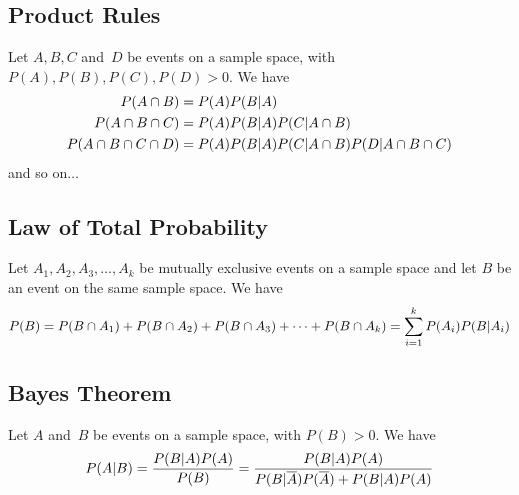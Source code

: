 \subsection*{Product Rules}
\begin{theorem}
Let $A, B, C$ and~$D$ be events on a sample space, with $P(A), P(B), P(C), P(D) > 0$. We have
\begin{align*}
    P(A \cap B) &= P(A)P(B \vert A) \\
    P(A \cap B \cap C) &= P(A)P(B \vert A)P(C \vert A \cap B) \\
    P(A \cap B \cap C \cap D) &=
    P(A)P(B \vert A)P(C \vert A \cap B)P(D \vert A \cap B \cap C) \\
\end{align*}
and so on$\ldots$
\end{theorem}
\subsection*{Law of Total Probability}
\begin{theorem}
Let $A_1, A_2, A_3,\ldots,A_k$ be mutually exclusive events on a sample space and let $B$ be an event on the same sample space. We have
\[
    P(B) = P(B \cap A_1) + P(B \cap A_2) + P(B \cap A_3) + \cdots + P(B \cap A_k)
    = \sum_{i = 1}^{k} P(A_i)P(B \vert A_i)
\]
\end{theorem}
\subsection*{Bayes Theorem}
\begin{theorem}
Let $A$ and~$B$ be events on a sample space, with $P(B) > 0$. We have
\[
    P(A \vert B) = \frac{P(B \vert A)P(A)}{P(B)}
    = \frac{P(B \vert A)P(A)}{P(B \vert \overline{A})P(\overline{A}) + P(B \vert A)P(A)}
\]
\end{theorem}